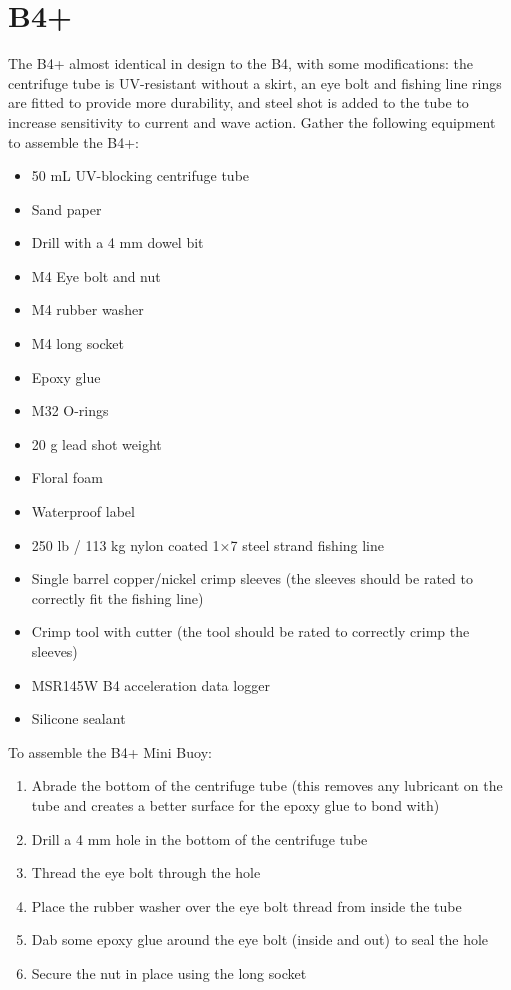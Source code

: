 \documentclass[
  letterpaper,
  DIV=11,
  numbers=noendperiod]{scrreprt}
\providecommand{\tightlist}{%
  \setlength{\itemsep}{0pt}\setlength{\parskip}{0pt}}\usepackage{longtable,booktabs,array}
\begin{document}
\hypertarget{b4-1}{%
\section{B4+}\label{b4-1}}

The B4+ almost identical in design to the B4, with some modifications:
the centrifuge tube is UV-resistant without a skirt, an eye bolt and
fishing line rings are fitted to provide more durability, and steel shot
is added to the tube to increase sensitivity to current and wave action.
Gather the following equipment to assemble the B4+:

\begin{itemize}
\tightlist
\item
  50 mL UV-blocking centrifuge tube
\item
  Sand paper
\item
  Drill with a 4 mm dowel bit
\item
  M4 Eye bolt and nut
\item
  M4 rubber washer
\item
  M4 long socket
\item
  Epoxy glue
\item
  M32 O-rings
\item
  20 g lead shot weight
\item
  Floral foam
\item
  Waterproof label
\item
  250 lb / 113 kg nylon coated 1×7 steel strand fishing line
\item
  Single barrel copper/nickel crimp sleeves (the sleeves should be rated
  to correctly fit the fishing line)
\item
  Crimp tool with cutter (the tool should be rated to correctly crimp
  the sleeves)
\item
  MSR145W B4 acceleration data logger
\item
  Silicone sealant
\end{itemize}

To assemble the B4+ Mini Buoy:

\begin{enumerate}
\def\labelenumi{\arabic{enumi}.}
\tightlist
\item
  Abrade the bottom of the centrifuge tube (this removes any lubricant
  on the tube and creates a better surface for the epoxy glue to bond
  with)
\item
  Drill a 4 mm hole in the bottom of the centrifuge tube
\item
  Thread the eye bolt through the hole
\item
  Place the rubber washer over the eye bolt thread from inside the tube
\item
  Dab some epoxy glue around the eye bolt (inside and out) to seal the
  hole
\item
  Secure the nut in place using the long socket
\end{enumerate}
\end{document}
